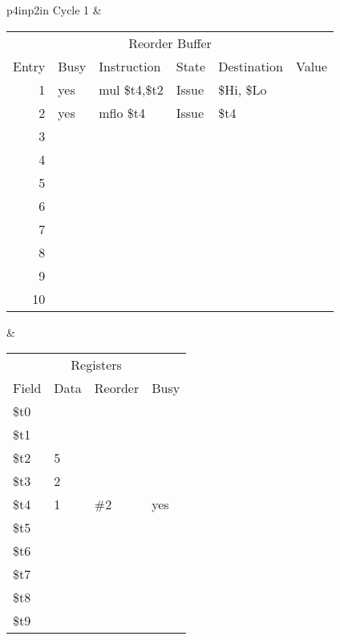 \noindent
\begin{tabular}{p{4in}p{2in}}
Cycle 1 & \\ \hline \hline

\noindent
\begin{tabular}{rlp{1in}lll}
\multicolumn{6}{c}{Reorder Buffer} \\
Entry & Busy & Instruction       & State & Destination & Value \\ \hline
 1    & yes  & mul  \$t4,\$t2    & Issue & \$Hi, \$Lo  &       \\
 2    & yes  & mflo \$t4         & Issue & \$t4        &       \\
 3    &      &                   &       &             &       \\
 4    &      &                   &       &             &       \\
 5    &      &                   &       &             &       \\
 6    &      &                   &       &             &       \\
 7    &      &                   &       &             &       \\
 8    &      &                   &       &             &       \\
 9    &      &                   &       &             &       \\
10    &      &                   &       &             &       \\
\end{tabular} &

\begin{tabular}{llll}
\multicolumn{4}{c}{Registers} \\
Field & Data & Reorder & Busy \\ \hline
\$t0  &      &         &      \\
\$t1  &      &         &      \\
\$t2  & 5    &         &      \\
\$t3  & 2    &         &      \\
\$t4  & 1    & \#2     & yes  \\
\$t5  &      &         &      \\
\$t6  &      &         &      \\
\$t7  &      &         &      \\
\$t8  &      &         &      \\
\$t9  &      &         &      \\
\end{tabular} \\


\end{tabular}
